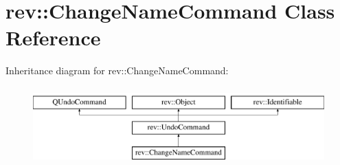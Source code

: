 \hypertarget{classrev_1_1_change_name_command}{}\section{rev\+::Change\+Name\+Command Class Reference}
\label{classrev_1_1_change_name_command}
Inheritance diagram for rev\+::Change\+Name\+Command\+:\begin{figure}[H]
\begin{center}
\leavevmode
\includegraphics[height=3.000000cm]{classrev_1_1_change_name_command}
\end{center}
\end{figure}
